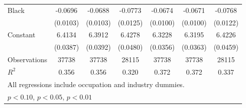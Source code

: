 {\begin{longtable}{l*{6}{c}}
Black               &     -0.0696\sym{***}&     -0.0688\sym{***}&     -0.0773\sym{***}&     -0.0674\sym{***}&     -0.0671\sym{***}&     -0.0768\sym{***}\\
                    &    (0.0103)         &    (0.0103)         &    (0.0125)         &    (0.0100)         &    (0.0100)         &    (0.0122)         \\
Constant            &      6.4134\sym{***}&      6.3912\sym{***}&      6.4278\sym{***}&      6.3228\sym{***}&      6.3195\sym{***}&      6.4226\sym{***}\\
                    &    (0.0387)         &    (0.0392)         &    (0.0480)         &    (0.0356)         &    (0.0363)         &    (0.0459)         \\
\hline  
Observations        &       37738         &       37738         &       28115         &       37738         &       37738         &       28115         \\
\(R^{2}\)           &       0.356         &       0.356         &       0.320         &       0.372         &       0.372         &       0.337         \\
\hline  
\multicolumn{7}{l}{\footnotesize All regressions include occupation and industry dummies.}\\
\multicolumn{7}{l}{\footnotesize \sym{*} \(p<0.10\), \sym{**} \(p<0.05\), \sym{***} \(p<0.01\)}\\
\end{longtable}
}
